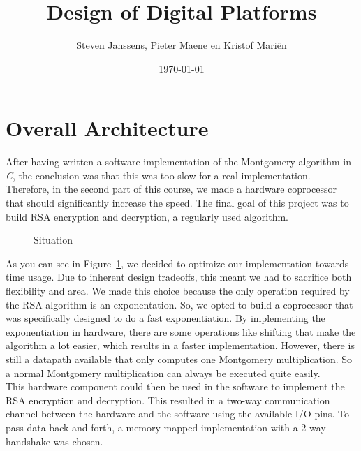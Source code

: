 \documentclass[a4paper]{article}
\title{Design of Digital Platforms}
\author{Steven Janssens, Pieter Maene en Kristof Mari\"en}
\date{\today}
\begin{document}
\maketitle

\section{Overall Architecture}

After having written a software implementation of the Montgomery algorithm in \textit{C}, the conclusion was that this was too slow for a real implementation. Therefore, in the second part of this course, we made a hardware coprocessor that should significantly increase the speed. The final goal of this project was to build RSA encryption and decryption, a regularly used algorithm.\\

\begin{figure}[h]
	\caption{Situation}
	\label{fig:situation}
\end{figure}

As you can see in Figure~\ref{fig:situation}, we decided to optimize our implementation towards time usage. Due to inherent design tradeoffs, this meant we had to sacrifice both flexibility and area. We made this choice because the only operation required by the RSA algorithm is an exponentation. So, we opted to build a coprocessor that was specifically designed to do a fast exponentiation. By implementing the exponentiation in hardware, there are some operations like shifting that make the algorithm a lot easier, which results in a faster implementation. However, there is still a datapath available that only computes one Montgomery multiplication. So a normal Montgomery multiplication can always be executed quite easily.\\

This hardware component could then be used in the software to implement the RSA encryption and decryption. This resulted in a two-way communication channel between the hardware and the software using the available I/O pins. To pass data back and forth, a memory-mapped implementation with a 2-way-handshake was chosen.
\end{document}
